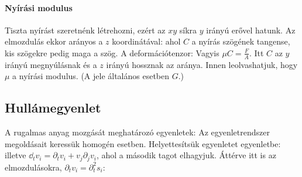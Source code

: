    \paragraph{Nyírási modulus}
    
    Tiszta nyírást szeretnénk létrehozni, ezért az $xy$ síkra $y$ irányú erővel hatunk.
   Az elmozdulás ekkor arányos a $z$ koordinátával:
    ahol $C$ a nyírás szögének tangense, kis szögekre pedig maga a szög.
   A deformációtenzor:
    Vagyis $\mu C=\frac{F}{A}$.
   Itt $C$ az $y$ irányú megnyúlásnak és a $z$ irányú hossznak az aránya.
   Innen leolvashatjuk, hogy $\mu$ a nyírási modulus. (A jele általános esetben $G$.)
    
  \subsection{Hullámegyenlet}
   
   A rugalmas anyag mozgását meghatározó egyenletek:
   Az egyenletrendszer megoldásait keressük homogén esetben.
   Helyettesítsük  egyenletet  egyenletbe:
   illetve $\dd_t v_i=\partial_t v_i+v_j\partial_j v_i$, ahol a második tagot elhagyjuk. Áttérve itt is az elmozdulásokra, $\partial_tv_i=\partial_t^2s_i$:
